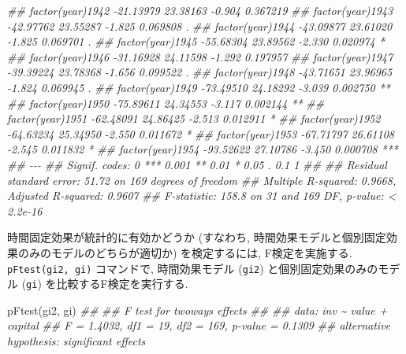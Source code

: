 \documentclass[
  letterpaper,
  xelatex,
  ja=standard, xelatex]{bxjsbook}
\newenvironment{Shaded}{\begin{snugshade}}{\end{snugshade}}
\newcommand{\DocumentationTok}[1]{\textcolor[rgb]{0.37,0.37,0.37}{\textit{#1}}}
\newcommand{\FunctionTok}[1]{\textcolor[rgb]{0.28,0.35,0.67}{#1}}
\newcommand{\NormalTok}[1]{\textcolor[rgb]{0.00,0.23,0.31}{#1}}
\begin{document}
\begin{Shaded}
\begin{Highlighting}[]
\DocumentationTok{\#\# factor(year)1942  {-}21.13979   23.38163  {-}0.904 0.367219    }
\DocumentationTok{\#\# factor(year)1943  {-}42.97762   23.55287  {-}1.825 0.069808 .  }
\DocumentationTok{\#\# factor(year)1944  {-}43.09877   23.61020  {-}1.825 0.069701 .  }
\DocumentationTok{\#\# factor(year)1945  {-}55.68304   23.89562  {-}2.330 0.020974 *  }
\DocumentationTok{\#\# factor(year)1946  {-}31.16928   24.11598  {-}1.292 0.197957    }
\DocumentationTok{\#\# factor(year)1947  {-}39.39224   23.78368  {-}1.656 0.099522 .  }
\DocumentationTok{\#\# factor(year)1948  {-}43.71651   23.96965  {-}1.824 0.069945 .  }
\DocumentationTok{\#\# factor(year)1949  {-}73.49510   24.18292  {-}3.039 0.002750 ** }
\DocumentationTok{\#\# factor(year)1950  {-}75.89611   24.34553  {-}3.117 0.002144 ** }
\DocumentationTok{\#\# factor(year)1951  {-}62.48091   24.86425  {-}2.513 0.012911 *  }
\DocumentationTok{\#\# factor(year)1952  {-}64.63234   25.34950  {-}2.550 0.011672 *  }
\DocumentationTok{\#\# factor(year)1953  {-}67.71797   26.61108  {-}2.545 0.011832 *  }
\DocumentationTok{\#\# factor(year)1954  {-}93.52622   27.10786  {-}3.450 0.000708 ***}
\DocumentationTok{\#\# {-}{-}{-}}
\DocumentationTok{\#\# Signif. codes:  0 \textquotesingle{}***\textquotesingle{} 0.001 \textquotesingle{}**\textquotesingle{} 0.01 \textquotesingle{}*\textquotesingle{} 0.05 \textquotesingle{}.\textquotesingle{} 0.1 \textquotesingle{} \textquotesingle{} 1}
\DocumentationTok{\#\# }
\DocumentationTok{\#\# Residual standard error: 51.72 on 169 degrees of freedom}
\DocumentationTok{\#\# Multiple R{-}squared:  0.9668, Adjusted R{-}squared:  0.9607 }
\DocumentationTok{\#\# F{-}statistic: 158.8 on 31 and 169 DF,  p{-}value: \textless{} 2.2e{-}16}
\end{Highlighting}
\end{Shaded}

時間固定効果が統計的に有効かどうか (すなわち,
時間効果モデルと個別固定効果のみのモデルのどちらが適切か)
を検定するには, F検定を実施する. \texttt{pFtest(gi2,\ gi)} コマンドで,
時間効果モデル (\texttt{gi2}) と個別固定効果のみのモデル (\texttt{gi})
を比較するF検定を実行する.

\begin{Shaded}
\begin{Highlighting}[]
\FunctionTok{pFtest}\NormalTok{(gi2, gi)}
\DocumentationTok{\#\# }
\DocumentationTok{\#\#  F test for twoways effects}
\DocumentationTok{\#\# }
\DocumentationTok{\#\# data:  inv \textasciitilde{} value + capital}
\DocumentationTok{\#\# F = 1.4032, df1 = 19, df2 = 169, p{-}value = 0.1309}
\DocumentationTok{\#\# alternative hypothesis: significant effects}
\end{Highlighting}
\end{Shaded}
\end{document}
